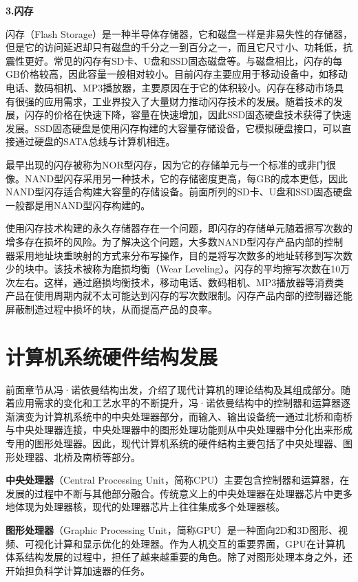 \documentclass[]{ctexbook}
\begin{document}
\textbf{3.闪存}

闪存（Flash Storage）是一种半导体存储器，它和磁盘一样是非易失性的存储器，但是它的访问延迟却只有磁盘的千分之一到百分之一，而且它尺寸小、功耗低，抗震性更好。常见的闪存有SD卡、U盘和SSD固态磁盘等。与磁盘相比，闪存的每GB价格较高，因此容量一般相对较小。目前闪存主要应用于移动设备中，如移动电话、数码相机、MP3播放器，主要原因在于它的体积较小。闪存在移动市场具有很强的应用需求，工业界投入了大量财力推动闪存技术的发展。随着技术的发展，闪存的价格在快速下降，容量在快速增加，因此SSD固态硬盘技术获得了快速发展。SSD固态硬盘是使用闪存构建的大容量存储设备，它模拟硬盘接口，可以直接通过硬盘的SATA总线与计算机相连。

最早出现的闪存被称为NOR型闪存，因为它的存储单元与一个标准的或非门很像。NAND型闪存采用另一种技术，它的存储密度更高，每GB的成本更低，因此NAND型闪存适合构建大容量的存储设备。前面所列的SD卡、U盘和SSD固态硬盘一般都是用NAND型闪存构建的。

使用闪存技术构建的永久存储器存在一个问题，即闪存的存储单元随着擦写次数的增多存在损坏的风险。为了解决这个问题，大多数NAND型闪存产品内部的控制器采用地址块重映射的方式来分布写操作，目的是将写次数多的地址转移到写次数少的块中。该技术被称为磨损均衡（Wear Leveling）。闪存的平均擦写次数在10万次左右。这样，通过磨损均衡技术，移动电话、数码相机、MP3播放器等消费类产品在使用周期内就不太可能达到闪存的写次数限制。闪存产品内部的控制器还能屏蔽制造过程中损坏的块，从而提高产品的良率。

\hypertarget{ux8ba1ux7b97ux673aux7cfbux7edfux786cux4ef6ux7ed3ux6784ux53d1ux5c55}{%
\section{计算机系统硬件结构发展}\label{ux8ba1ux7b97ux673aux7cfbux7edfux786cux4ef6ux7ed3ux6784ux53d1ux5c55}}

前面章节从冯·诺依曼结构出发，介绍了现代计算机的理论结构及其组成部分。随着应用需求的变化和工艺水平的不断提升，冯·诺依曼结构中的控制器和运算器逐渐演变为计算机系统中的中央处理器部分，而输入、输出设备统一通过北桥和南桥与中央处理器连接，中央处理器中的图形处理功能则从中央处理器中分化出来形成专用的图形处理器。因此，现代计算机系统的硬件结构主要包括了中央处理器、图形处理器、北桥及南桥等部分。

\textbf{中央处理器}（Central Processing Unit，简称CPU）主要包含控制器和运算器，在发展的过程中不断与其他部分融合。传统意义上的中央处理器在处理器芯片中更多地体现为处理器核，现代的处理器芯片上往往集成多个处理器核。

\textbf{图形处理器}（Graphic Processing Unit，简称GPU）是一种面向2D和3D图形、视频、可视化计算和显示优化的处理器。作为人机交互的重要界面，GPU在计算机体系结构发展的过程中，担任了越来越重要的角色。除了对图形处理本身之外，还开始担负科学计算加速器的任务。
\end{document}
